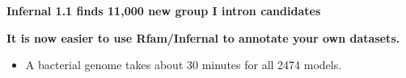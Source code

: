 \documentclass[landscape]{slides}
\begin{document}
%
%
\begin{slide}
\begin{center}
\textbf{Infernal 1.1 finds 11,000 new group I intron candidates}
\end{center}


\vfill
\vfill
\small
{} 
\end{slide}
\begin{slide}
\begin{center}
\textbf{It is now easier to use Rfam/Infernal to annotate your own
  datasets.} \\

\small
\begin{itemize}
\item A bacterial genome takes about 30 minutes for all 2474 models.
\end{itemize}

\end{center}


\vfill
\small
{} 
\end{slide}
\end{document}
